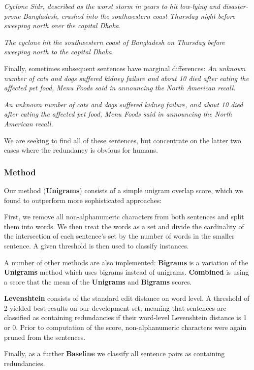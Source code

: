 \documentclass[a4paper,10pt]{scrartcl}
\theoremstyle{style}
\begin{document}
\textit{Cyclone Sidr, described as the worst storm in years to hit low-lying and disaster-prone Bangladesh, crashed into the southwestern coast Thursday night before sweeping north over the capital Dhaka.}

\textit{The cyclone hit the southwestern coast of Bangladesh on Thursday before sweeping north to the capital Dhaka.}

Finally, sometimes subsequent sentences have marginal differences:
\textit{An unknown number of cats and dogs suffered kidney failure and about 10 died after eating the affected pet food, Menu Foods said in announcing the North American recall.}

\textit{An unknown number of cats and dogs suffered kidney failure, and about 10 died after eating the affected pet food, Menu Foods said in announcing the North American recall.}

We are seeking to find all of these sentences, but concentrate on the latter two cases where the redundancy is obvious for humans.

\subsubsection{Method}

Our method (\textbf{Unigrams}) consists of a simple unigram overlap score, which we found to outperform more sophisticated approaches:

First, we remove all non-alphanumeric characters from both sentences and split them into words. We then treat the words as a set and divide the cardinality of the intersection of each sentence's set by the number of words in the smaller sentence. A given threshold is then used to classify instances.

A number of other methods are also implemented: \textbf{Bigrams} is a variation of the \textbf{Unigrams} method which uses bigrams instead of unigrams. \textbf{Combined} is using a score that the mean of the \textbf{Unigrams} and \textbf{Bigrams} scores.

\textbf{Levenshtein} consists of the standard edit distance\citep{levenshtein1966binary} on word level. A threshold of 2 yielded best results on our development set, meaning that sentences are classified as containing redundancies if their word-level Levenshtein distance is 1 or 0. Prior to computation of the score, non-alphanumeric characters were again pruned from the sentences.

Finally, as a further \textbf{Baseline} we classify all sentence pairs as containing redundancies.
\end{document}
